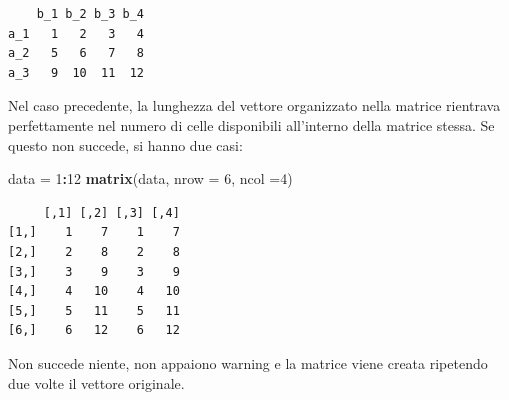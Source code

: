 \documentclass[
  a4paper,
  DIV=11,
  numbers=noendperiod]{scrreprt}
\newenvironment{Shaded}{\begin{snugshade}}{\end{snugshade}}
\newcommand{\AttributeTok}[1]{\textcolor[rgb]{0.13,0.29,0.53}{#1}}
\newcommand{\DecValTok}[1]{\textcolor[rgb]{0.00,0.00,0.81}{#1}}
\newcommand{\FunctionTok}[1]{\textcolor[rgb]{0.13,0.29,0.53}{\textbf{#1}}}
\newcommand{\NormalTok}[1]{#1}
\newcommand{\OtherTok}[1]{\textcolor[rgb]{0.56,0.35,0.01}{#1}}
\newcommand{\SpecialCharTok}[1]{\textcolor[rgb]{0.81,0.36,0.00}{\textbf{#1}}}
\begin{document}
\begin{verbatim}
    b_1 b_2 b_3 b_4
a_1   1   2   3   4
a_2   5   6   7   8
a_3   9  10  11  12
\end{verbatim}

Nel caso precedente, la lunghezza del vettore organizzato nella matrice
rientrava perfettamente nel numero di celle disponibili all'interno
della matrice stessa. Se questo non succede, si hanno due casi:

\begin{tcolorbox}[enhanced jigsaw, toprule=.15mm, left=2mm, leftrule=.75mm, breakable, coltitle=black, title={Il numero di celle è un moltiplicando/dividendo della lunghezza del
vettore}, bottomtitle=1mm, opacitybacktitle=0.6, toptitle=1mm, titlerule=0mm, bottomrule=.15mm, colframe=quarto-callout-note-color-frame, arc=.35mm, rightrule=.15mm, opacityback=0, colbacktitle=quarto-callout-note-color!10!white, colback=white]

\begin{Shaded}
\begin{Highlighting}[]
\NormalTok{data }\OtherTok{=} \DecValTok{1}\SpecialCharTok{:}\DecValTok{12}
\FunctionTok{matrix}\NormalTok{(data, }\AttributeTok{nrow =} \DecValTok{6}\NormalTok{, }\AttributeTok{ncol =}\DecValTok{4}\NormalTok{)}
\end{Highlighting}
\end{Shaded}

\begin{verbatim}
     [,1] [,2] [,3] [,4]
[1,]    1    7    1    7
[2,]    2    8    2    8
[3,]    3    9    3    9
[4,]    4   10    4   10
[5,]    5   11    5   11
[6,]    6   12    6   12
\end{verbatim}

Non succede niente, non appaiono warning e la matrice viene creata
ripetendo due volte il vettore originale.

\end{tcolorbox}
\end{document}
